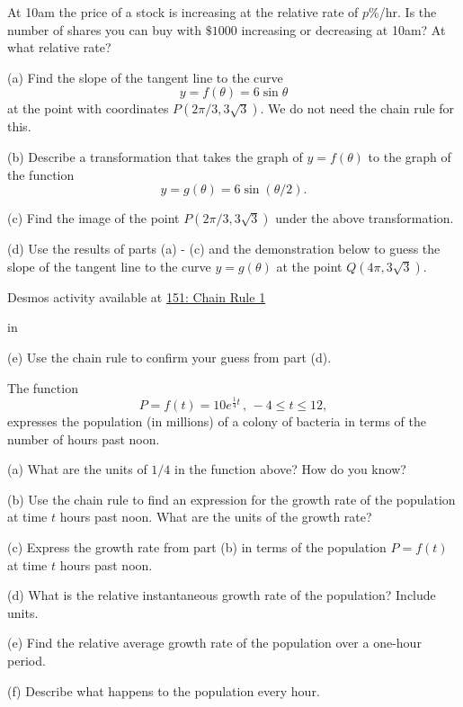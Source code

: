 \documentclass{ximera}
\newcommand{\pskip}{\vskip 0.1 in}
\begin{document}
\begin{example} \label{Ex:sd0fset}
At 10am the price of a stock is increasing at the relative rate of $p\%$/hr. Is the number of shares you can buy with $\$1000$ increasing or decreasing at 10am? At what relative rate?


\end{example}


\begin{example}  \label{Ex:CHr34rrer}
(a) Find the slope of the tangent line to the curve
\[
   y = f(\theta) = 6 \sin \theta
\]
at the point with coordinates $P(2\pi/3, 3\sqrt{3})$. We do not need the chain rule for this.

(b) Describe a transformation that takes the graph of $y=f(\theta)$ to the graph of the function
\[
        y = g(\theta) = 6\sin (\theta/2) .
\]

(c) Find the image of the point $P(2\pi/3,3\sqrt{3})$ under the above transformation.

(d) Use the results of parts (a) - (c) and the demonstration below to guess the slope of the tangent line to the curve $y=g(\theta)$ at the point $Q(4\pi,3\sqrt{3})$.

\begin{onlineOnly}
    \begin{center}
\end{center}
\end{onlineOnly}

Desmos activity available at \href{https://www.desmos.com/calculator/mqjxpsqyo5}{151: Chain Rule 1}

\pskip

(e) Use the chain rule to confirm your guess from part (d).

\end{example}


\begin{example}  \label{Ex:Chdfr5llk}
The function 
\[
       P = f(t) = 10 e^{\frac{1}{4}t} \, , \, -4\leq t \leq 12 ,
\] 
expresses the population (in millions) of a colony of bacteria in terms of the number of hours past noon.

(a) What are the units of $1/4$ in the function above? How do you know?

(b)  Use the chain rule to find an expression for the growth rate of the population at time $t$ hours past noon. What are the units of the growth rate?

(c) Express the growth rate from part (b) in terms of the population $P=f(t)$ at time $t$ hours past noon.

(d) What is the relative instantaneous growth rate of the population? Include units.

(e) Find the relative average growth rate of the population over a one-hour period. 

(f) Describe what happens to the population every hour.

\end{example}
\end{document}
